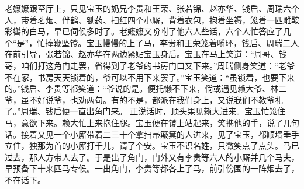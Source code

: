 \documentclass[12pt,oneside]{book}
\begin{document}
老嬷嬷跟至厅上，只见宝玉的奶兄李贵和王荣、张若锦、赵亦华、钱启、周瑞六个人，带着茗烟、伴鹤、锄药、扫红四个小厮，背着衣包，抱着坐褥，笼着一匹雕鞍彩辔的白马，早已伺候多时了。老嬷嬷又吩咐了他六人些话，六个人忙答应了几个“是”，忙捧鞭坠镫。宝玉慢慢的上了马，李贵和王荣笼着嚼环，钱启、周瑞二人在前引导，张若锦、赵亦华在两边紧贴宝玉身后。宝玉在马上笑道：“周哥、钱哥，咱们打这角门走罢，省得到了老爷的书房门口又下来。”周瑞侧身笑道：“老爷不在家，书房天天锁着的，爷可以不用下来罢了。”宝玉笑道：“虽锁着，也要下来的。”钱启、李贵等都笑道：“爷说的是。便托懒不下来，倘或遇见赖大爷、林二爷，虽不好说爷，也劝两句。有的不是，都派在我们身上，又说我们不教爷礼了。”周瑞、钱启便一直出角门来。
正说话时，顶头果见赖大进来。宝玉忙笼住马，意欲下来。赖大忙上来抱住腿。宝玉便在镫上站起来，笑携他的手，说了几句话。接着又见一个小厮带着二三十个拿扫帚簸箕的人进来，见了宝玉，都顺墙垂手立住，独那为首的小厮打千儿，请了个安。宝玉不识名姓，只微笑点了点头。马已过去，那人方带人去了。于是出了角门，门外又有李贵等六人的小厮并几个马夫，早预备下十来匹马专候。一出角门，李贵等都各上了马，前引傍围的一阵烟去了，不在话下。
\end{document}
